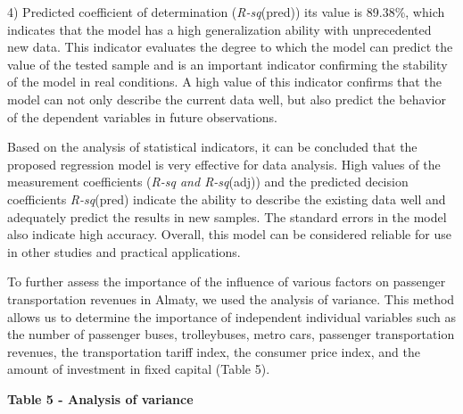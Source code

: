 4) Predicted coefficient of determination (\emph{R-sq}(pred)) its value
is 89.38\%, which indicates that the model has a high generalization
ability with unprecedented new data. This indicator evaluates the degree
to which the model can predict the value of the tested sample and is an
important indicator confirming the stability of the model in real
conditions. A high value of this indicator confirms that the model can
not only describe the current data well, but also predict the behavior
of the dependent variables in future observations.

Based on the analysis of statistical indicators, it can be concluded
that the proposed regression model is very effective for data analysis.
High values \hspace{0pt}\hspace{0pt}of the measurement coefficients
(\emph{R-sq and R-sq}(adj)) and the predicted decision coefficients
\emph{R-sq}(pred) indicate the ability to describe the existing data
well and adequately predict the results in new samples. The standard
errors in the model also indicate high accuracy. Overall, this model can
be considered reliable for use in other studies and practical
applications.

To further assess the importance of the influence of various factors on
passenger transportation revenues in Almaty, we used the analysis of
variance. This method allows us to determine the importance of
independent individual variables such as the number of passenger buses,
trolleybuses, metro cars, passenger transportation revenues, the
transportation tariff index, the consumer price index, and the amount of
investment in fixed capital (Table 5).

{\bfseries Table 5 - Analysis of variance}

